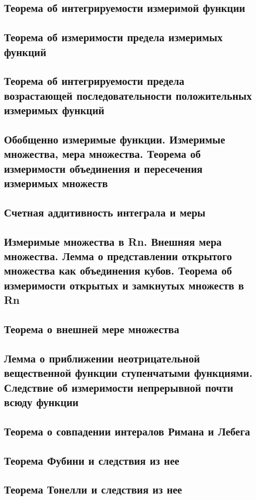 \documentclass[a4paper]{article}
\theoremstyle{definition}
\theoremstyle{remark}
\begin{document}
    \subsection{ Теорема об интегрируемости измеримой функции}
    \subsection{ Теорема об измеримости предела измеримых функций}
    \subsection{ Теорема об интегрируемости предела возрастающей
    последовательности положительных измеримых функций}
    \subsection{ Обобщенно измеримые функции. Измеримые множества, мера множества. Теорема об измеримости объединения и пересечения измеримых множеств}
    \subsection{ Счетная аддитивность интеграла и меры}
    \subsection{ Измеримые множества в Rn. Внешняя мера множества. Лемма о представлении открытого множества как объединения кубов. Теорема об измеримости открытых и замкнутых множеств в Rn}
    \subsection{ Теорема о внешней мере множества}
    \subsection{ Лемма о приближении неотрицательной вещественной функции ступенчатыми функциями. Следствие об измеримости непрерывной почти всюду функции}
    \subsection{ Теорема о совпадении интералов Римана и Лебега}
    \subsection{ Теорема Фубини и следствия из нее}
    \subsection{ Теорема Тонелли и следствия из нее}
\end{document}
